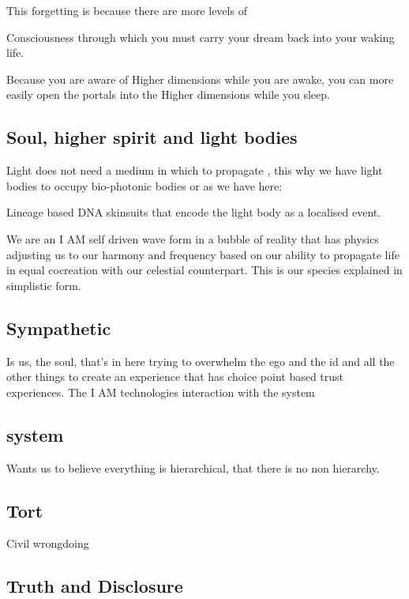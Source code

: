 This forgetting is because there are more levels of

Consciousness through which you must carry your dream back into your
waking life.

Because you are aware of Higher dimensions while you are awake, you can
more easily open the portals into the Higher dimensions while you sleep.

\subsection{Soul, higher spirit and light
bodies}\label{soul-higher-spirit-and-light-bodies}

Light does not need a medium in which to propagate , this why we have
light bodies to occupy bio-photonic bodies or as we have here:

Lineage based DNA skinsuits that encode the light body as a localised
event.

We are an I AM self driven wave form in a bubble of reality that has
physics adjusting us to our harmony and frequency based on our ability
to propagate life in equal cocreation with our celestial counterpart.
This is our species explained in simplistic form.

\subsection{Sympathetic}\label{sympathetic}

Is us, the soul, that's in here trying to overwhelm the ego and the id
and all the other things to create an experience that has choice point
based trust experiences. The I AM technologies interaction with the
system

\subsection{system}\label{system}

Wants us to believe everything is hierarchical, that there is no non
hierarchy.

\subsection{Tort}\label{tort}

Civil wrongdoing

\subsection{Truth and Disclosure}\label{truth-and-disclosure}

